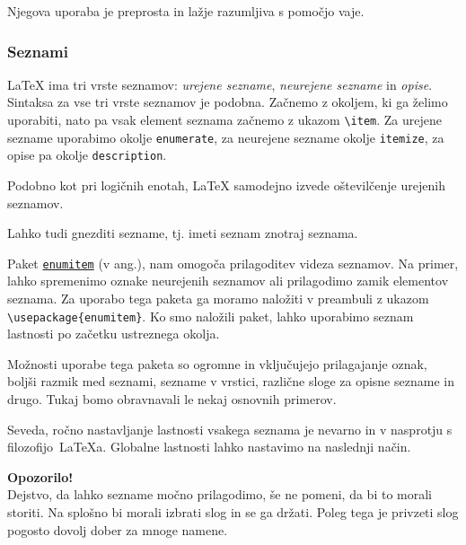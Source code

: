 Njegova uporaba je preprosta in lažje razumljiva s pomočjo vaje.

\subsubsection{Seznami}\label{latexOsnovnaOkolja_seznami}

LaTeX ima tri vrste seznamov: \textit{urejene sezname}, \textit{neurejene sezname} in \textit{opise}.
Sintaksa za vse tri vrste seznamov je podobna.
Začnemo z okoljem, ki ga želimo uporabiti, nato pa vsak element seznama začnemo z ukazom \texttt{{\textbackslash}item}.
Za urejene sezname uporabimo okolje \texttt{enumerate}, za neurejene sezname okolje \texttt{itemize}, za opise pa okolje \texttt{description}.

\begin{example}\label{latexuvod_seznami}\end{example}Podobno kot pri logičnih enotah, LaTeX samodejno izvede oštevilčenje urejenih seznamov.

Lahko tudi gnezditi sezname, tj. imeti seznam znotraj seznama.

\begin{example}\label{latexuvod_gnezdeniseznami}\end{example}Paket \href{https://ctan.org/pkg/enumitem?lang=en}{\texttt{enumitem}} (v ang.), nam omogoča prilagoditev videza seznamov.
Na primer, lahko spremenimo oznake neurejenih seznamov ali prilagodimo zamik elementov seznama.
Za uporabo tega paketa ga moramo naložiti v preambuli z ukazom \texttt{{\textbackslash}usepackage\{enumitem\}}.
Ko smo naložili paket, lahko uporabimo seznam lastnosti po začetku ustreznega okolja.

Možnosti uporabe tega paketa so ogromne in vključujejo prilagajanje oznak, boljši razmik med seznami, sezname v vrstici, različne sloge za opisne sezname in drugo. Tukaj bomo obravnavali le nekaj osnovnih primerov.

\begin{example}\label{latexuvod_enumitem-1}\end{example}\begin{example}\label{latexuvod_enumitem-2}\end{example}Seveda, ročno nastavljanje lastnosti vsakega seznama je nevarno in v nasprotju s filozofijo~LaTeXa.
Globalne lastnosti lahko nastavimo na naslednji način.

\begin{example}\label{latexuvod_enumitem-3}\end{example}\begin{framed}
\textbf{Opozorilo!}\\
Dejstvo, da lahko sezname močno prilagodimo, še ne pomeni, da bi to morali storiti.
Na splošno bi morali izbrati slog in se ga držati.
Poleg tega je privzeti slog pogosto dovolj dober za mnoge namene.
\end{framed}

